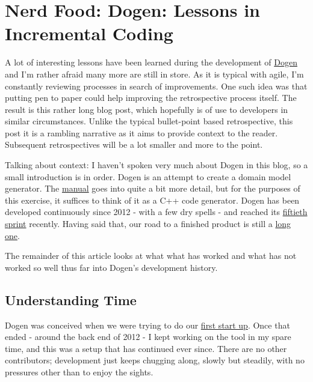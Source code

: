 \documentclass{book}
\begin{document}
\chapter{Nerd Food: Dogen: Lessons in Incremental Coding}

A lot of interesting lessons have been learned during the development
of \href{https://github.com/DomainDrivenConsulting/dogen}{Dogen} and I'm rather afraid many more are still in store. As it is
typical with agile, I'm constantly reviewing processes in search of
improvements. One such idea was that putting pen to paper could help
improving the retrospective process itself. The result is this rather
long blog post, which hopefully is of use to developers in similar
circumstances. Unlike the typical bullet-point based retrospective,
this post it is a rambling narrative as it aims to provide context to
the reader. Subsequent retrospectives will be a lot smaller and more
to the point.

Talking about context: I haven't spoken very much about Dogen in this
blog, so a small introduction is in order. Dogen is an attempt to
create a domain model generator. The \href{https://github.com/DomainDrivenConsulting/dogen/blob/master/doc/manual/manual.org#fundamental-building-blocks}{manual} goes into quite a bit more
detail, but for the purposes of this exercise, it suffices to think of
it as a C++ code generator. Dogen has been developed continuously
since 2012 - with a few dry spells - and reached its \href{https://github.com/DomainDrivenConsulting/dogen/blob/master/doc/agile/sprint_backlog_50.org}{fiftieth sprint}
recently. Having said that, our road to a finished product is still a
\href{https://github.com/DomainDrivenConsulting/dogen/blob/master/doc/agile/definition_of_done.org}{long one}.

The remainder of this article looks at what what has worked and what
has not worked so well thus far into Dogen's development history.

\section*{Understanding Time}
\label{sec-1}

Dogen was conceived when we were trying to do our \href{http://kitanda.co.uk/html/index.html}{first start up}. Once
that ended - around the back end of 2012 - I kept working on the tool
in my spare time, and this was a setup that has continued ever
since. There are no other contributors; development just keeps
chugging along, slowly but steadily, with no pressures other than to
enjoy the sights.
\end{document}
